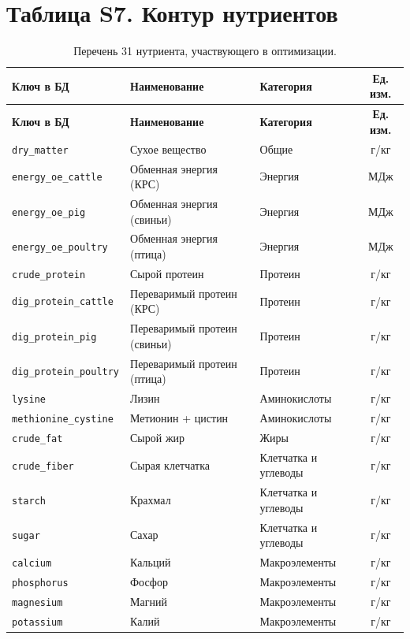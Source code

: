\documentclass[11pt]{article}
\begin{document}
\section*{Таблица S7. Контур нутриентов}
\begin{longtable}{lllc}
\caption{Перечень 31 нутриента, участвующего в оптимизации.}\label{tab:s7_nutrients} \\
\toprule
\textbf{Ключ в БД} & \textbf{Наименование} & \textbf{Категория} & \textbf{Ед. изм.} \\
\midrule
\endfirsthead
\toprule
\textbf{Ключ в БД} & \textbf{Наименование} & \textbf{Категория} & \textbf{Ед. изм.} \\
\midrule
\endhead
\bottomrule
\endfoot
\bottomrule
\endlastfoot
\texttt{dry\_matter} & Сухое вещество & Общие & г/кг \\
\texttt{energy\_oe\_cattle} & Обменная энергия (КРС) & Энергия & МДж \\
\texttt{energy\_oe\_pig} & Обменная энергия (свиньи) & Энергия & МДж \\
\texttt{energy\_oe\_poultry} & Обменная энергия (птица) & Энергия & МДж \\
\texttt{crude\_protein} & Сырой протеин & Протеин & г/кг \\
\texttt{dig\_protein\_cattle} & Переваримый протеин (КРС) & Протеин & г/кг \\
\texttt{dig\_protein\_pig} & Переваримый протеин (свиньи) & Протеин & г/кг \\
\texttt{dig\_protein\_poultry} & Переваримый протеин (птица) & Протеин & г/кг \\
\texttt{lysine} & Лизин & Аминокислоты & г/кг \\
\texttt{methionine\_cystine} & Метионин + цистин & Аминокислоты & г/кг \\
\texttt{crude\_fat} & Сырой жир & Жиры & г/кг \\
\texttt{crude\_fiber} & Сырая клетчатка & Клетчатка и углеводы & г/кг \\
\texttt{starch} & Крахмал & Клетчатка и углеводы & г/кг \\
\texttt{sugar} & Сахар & Клетчатка и углеводы & г/кг \\
\texttt{calcium} & Кальций & Макроэлементы & г/кг \\
\texttt{phosphorus} & Фосфор & Макроэлементы & г/кг \\
\texttt{magnesium} & Магний & Макроэлементы & г/кг \\
\texttt{potassium} & Калий & Макроэлементы & г/кг \\

\end{longtable}
\end{document}
